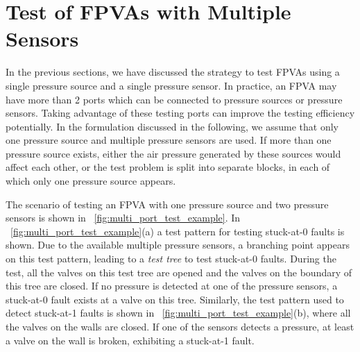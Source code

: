 \documentclass[journal,twoside]{IEEEtran}
\begin{document}
\section{Test of FPVAs with Multiple Sensors}\label{sec:multi_port}

In the previous sections, we have discussed the strategy to test FPVAs using
a single pressure source and a single pressure sensor. 
In practice, an FPVA may have more than 2 ports 
which can be connected to pressure sources or pressure sensors.
Taking advantage of these testing ports can improve the testing efficiency
potentially. In the formulation discussed in the following, 
we assume that only one pressure source and multiple pressure sensors 
are used. If more than one pressure source exists, either  
the air pressure generated by these sources would affect each other, or the
test problem is split into separate blocks, in each of which only one pressure source
appears.

The scenario of testing an FPVA with one pressure source and two pressure
sensors is shown in \figname~\ref{fig:multi_port_test_example}. In
\figname~\ref{fig:multi_port_test_example}(a) a test pattern for testing
stuck-at-0 faults is shown. Due to the available multiple pressure sensors,
a branching point appears on this test pattern, leading to a \textit{test
tree} to test stuck-at-0 faults.
During the test, all the valves on this test tree
are opened and the valves on the boundary of this tree are closed. If no
pressure is detected at one of the pressure sensors, a stuck-at-0 fault exists
 at a valve on this tree.
Similarly, the test pattern used to detect stuck-at-1 faults is
shown in \figname~\ref{fig:multi_port_test_example}(b), where all the valves on
the walls are closed. If one of the sensors detects a pressure, at least a
valve on the wall is broken, exhibiting a stuck-at-1 fault.
\end{document}
